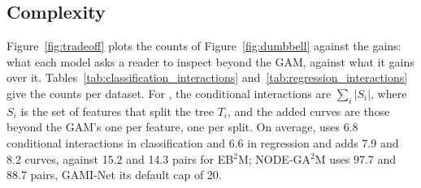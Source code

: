\begin{table}[!htbp]
\caption{Classification accuracy vs.\ baselines (mean $\pm$ std.\ dev.\ over 5-fold CV).
\textbf{}/\textbf{}: higher/lower than \method{} by more than one std.\ dev.\ (the larger of the two);
\textbf{$\mathbf{=}$}: within one.}
\label{tab:clf-acc}
\centering
{}
\end{table}

\begin{table}[!htbp]
\caption{Regression RMSE vs.\ baselines (mean $\pm$ std.\ dev.\ over 5-fold CV).
\textbf{}/\textbf{}: lower/higher than \method{} by more than one std.\ dev.\ (the larger of the two);
\textbf{$\mathbf{=}$}: within one.
Elevators and Ailerons are scaled; NAM, NODE-GA$^2$M and GAMI-Net there are from an earlier run that kept one significant digit, too few to rank them against \method{}, so they count as draws.}
\label{tab:regr-rmse}
\centering
{}
\end{table}

\subsection{Complexity}\label{app:interactions}


Figure~\ref{fig:tradeoff} plots the counts of Figure~\ref{fig:dumbbell} against the gains: what each model asks a reader to inspect beyond the GAM, against what it gains over it.
Tables~\ref{tab:classification_interactions} and~\ref{tab:regression_interactions} give the counts per dataset.
For \method{}, the conditional interactions are $\sum_i |S_i|$, where $S_i$ is the set of features that split the tree $T_i$, and the added curves are those beyond the GAM's one per feature, one per split.
On average, \method{} uses 6.8 conditional interactions in classification and 6.6 in regression and adds 7.9 and 8.2 curves, against 15.2 and 14.3 pairs for EB$^2$M; NODE-GA$^2$M uses 97.7 and 88.7 pairs, GAMI-Net its default cap of 20.

